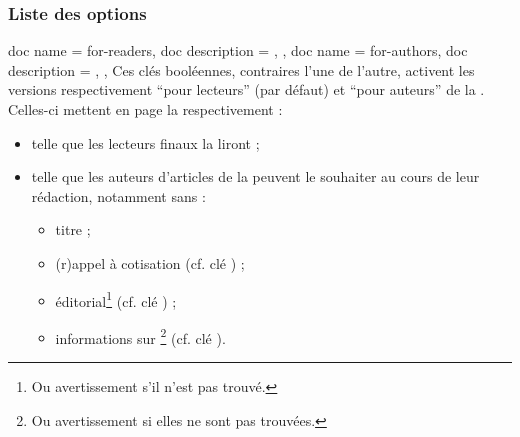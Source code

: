 \documentclass{letgut}
\begin{document}
\subsubsection{Liste des options}
\label{sec:liste-des-options}

\begin{docKeys}
  {
    {
      doc name = for-readers,
      doc description = {},
    },
    {
      doc name = for-authors,
      doc description = {},
    },
  }%
  Ces clés booléennes, contraires l'une de l'autre, activent les versions
  respectivement \enquote{pour lecteurs} (par défaut) et \enquote{pour auteurs}
  de la . Celles-ci mettent en page la  respectivement :
  \begin{itemize}
  \item telle que les lecteurs finaux la liront ;
  \item telle que les auteurs d'articles de la  peuvent le souhaiter au
    cours de leur rédaction, notamment sans :
    \begin{itemize}
    \item titre ;
    \item (r)appel à cotisation (cf. clé ) ;
    \item éditorial\footnote{Ou avertissement s'il n'est pas trouvé.} (cf. clé
      ) ;
    \item informations sur \gut{}\footnote{Ou avertissement si elles ne sont pas
        trouvées.}  (cf. clé ).
    \end{itemize}
  \end{itemize}
\end{docKeys}
\end{document}
